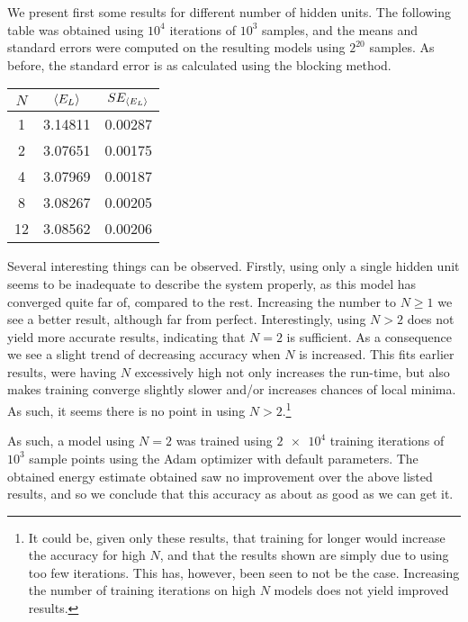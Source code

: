 \documentclass[a4paper, 11pt]{article}
\begin{document}
\begin{multicols}{2}
    We present first some results for different number of hidden units. The
    following table was obtained using $10^4$ iterations of $10^3$
    samples, and the means and standard errors were computed on the resulting
    models using $2^{20}$ samples. As before, the standard error is as
    calculated using the blocking method.

    \begin{center}
        \vspace{0.5cm}
        \begin{tabular}{|c|c|c|}\hline
            $N$ & $\expval{E_L}$ & $SE_{\expval{E_L}}$\\\hline
            1 & 3.14811 & 0.00287\\
            2 & 3.07651 & 0.00175\\
            4 & 3.07969 & 0.00187\\
            8 & 3.08267 & 0.00205\\
            12 & 3.08562 & 0.00206\\\hline
        \end{tabular}
    \end{center}

    Several interesting things can be observed. Firstly, using only a single
    hidden unit seems to be inadequate to describe the system properly, as this
    model has converged quite far of, compared to the rest. Increasing the
    number to $N \geq 1$ we see a better result, although far from perfect.
    Interestingly, using $N>2$ does not yield more accurate results, indicating
    that $N=2$ is sufficient. As a consequence we see a slight trend of
    decreasing accuracy when $N$ is increased. This fits earlier results, were
    having $N$ excessively high not only increases the run-time, but also makes
    training converge slightly slower and/or increases chances of local minima.
    As such, it seems there is no point in using $N > 2$.\footnote{It could be,
    given only these results, that training for longer would increase the
    accuracy for high $N$, and that the results shown are simply due to using
    too few iterations. This has, however, been seen to not be the case.
    Increasing the number of training iterations on high $N$ models does not
    yield improved results.}
    
    As such, a model using $N=2$ was trained using $\num{2e4}$ training
    iterations of $10^3$ sample points using the Adam optimizer with default
    parameters. The obtained energy estimate obtained saw no improvement
    over the above listed results, and so we conclude that this accuracy as
    about as good as we can get it. 
    

\end{multicols}
\end{document}
